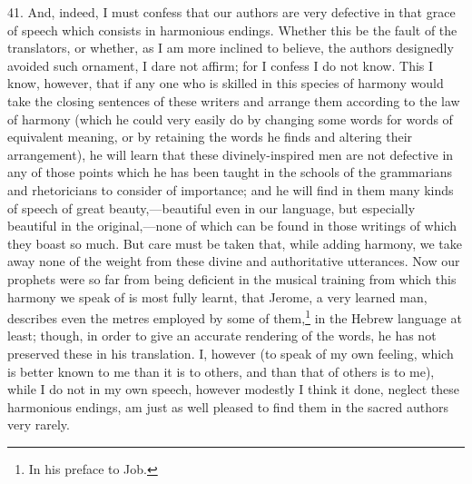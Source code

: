 41. And, indeed, I must confess that our authors are very defective in that grace of speech which consists in harmonious endings. Whether this be the fault of the translators, or whether, as I am more inclined to believe, the authors designedly avoided such ornament, I dare not affirm; for I confess I do  not know. This I know, however, that if any one who is skilled in this species of harmony would take the closing sentences of these writers and arrange them according to the law of harmony (which he could very easily do by changing some words for words of equivalent meaning, or by retaining the words he finds and altering their arrangement), he will learn that these divinely-inspired men are not defective in any of those points which he has been taught in the schools of the grammarians and rhetoricians to consider of importance; and he will find in them many kinds of speech of great beauty,—beautiful even in our language, but especially beautiful in the original,—none of which can be found in those writings of which they boast so much. But care must be taken that, while adding harmony, we take away none of the weight from these divine and authoritative utterances. Now our prophets were so far from being deficient in the musical training from which this harmony we speak of is most fully learnt, that Jerome, a very learned man, describes even the metres employed by some of them,\footnote{In his preface to Job.} in the Hebrew language at least; though, in order to give an accurate rendering of the words, he has not preserved these in his translation. I, however (to speak of my own feeling, which is better known to me than it is to others, and than that of others is to me), while I do not in my own speech, however modestly I think it done, neglect these harmonious endings, am just as well pleased to find them in the sacred authors very rarely.


